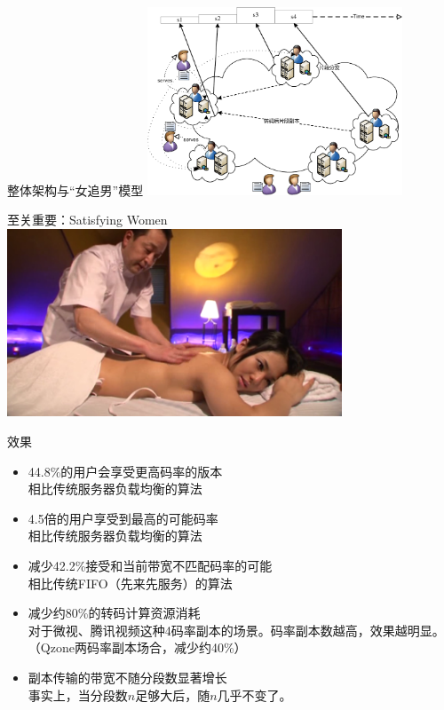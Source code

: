 \documentclass{beamer}
\begin{document}
\begin{frame}{整体架构与“女追男”模型}
\includegraphics[height=5.6cm]{fig/transcoding_delivery.pdf}
\end{frame}
\begin{frame}{至关重要：Satisfying Women}
\includegraphics[height=5.6cm]{fig/massage2.png}
\end{frame}
\begin{frame}{效果}
\begin{itemize}
\item 44.8\%的用户会享受更高码率的版本\\
	相比传统服务器负载均衡的算法
\item 4.5倍的用户享受到最高的可能码率\\
	相比传统服务器负载均衡的算法
\item 减少42.2\%接受和当前带宽不匹配码率的可能\\
	相比传统FIFO（先来先服务）的算法
\item 减少约80\%的转码计算资源消耗\\
	对于微视、腾讯视频这种4码率副本的场景。码率副本数越高，效果越明显。（Qzone两码率副本场合，减少约40\%）
\item 副本传输的带宽不随分段数显著增长\\
	事实上，当分段数$n$足够大后，随$n$几乎不变了。
\end{itemize}
\end{frame}
\end{document}
